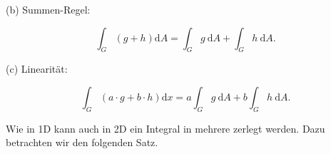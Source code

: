 \documentclass[10pt]{article}
\begin{document}
(b) Summen-Regel:


\begin{equation*}
\int_{G}(g+h) \mathrm{d} A=\int_{G} g \mathrm{~d} A+\int_{G} h \mathrm{~d} A . \tag{2.70}
\end{equation*}


(c) Linearität:


\begin{equation*}
\int_{G}(a \cdot g+b \cdot h) \mathrm{d} x=a \int_{G} g \mathrm{~d} A+b \int_{G} h \mathrm{~d} A . \tag{2.71}
\end{equation*}


Wie in 1D kann auch in 2D ein Integral in mehrere zerlegt werden. Dazu betrachten wir den folgenden Satz.
\end{document}
